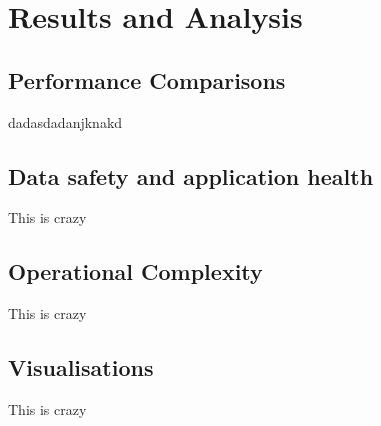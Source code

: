 \newpage
\section{Results and Analysis}


\subsection{Performance Comparisons}
    dadasdadanjknakd
\subsection{Data safety and application health}
    This is crazy
\subsection{Operational Complexity}
    This is crazy
\subsection{Visualisations}
    This is crazy